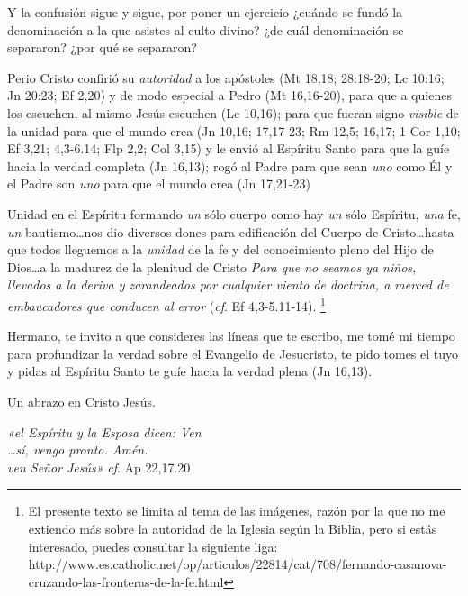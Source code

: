 \documentclass{article}
\begin{document}
\noindent
Y la confusión sigue y sigue, por poner un ejercicio ¿cuándo se fundó la denominación a la que asistes al culto divino? ¿de cuál denominación se separaron? ¿por qué se separaron?

Perio Cristo confirió su \emph{autoridad} a los apóstoles (Mt 18,18; 28:18-20; Lc 10:16; Jn 20:23; Ef 2,20) y de modo especial a Pedro (Mt 16,16-20), para que a quienes los escuchen, al mismo Jesús escuchen (Lc 10,16); para que fueran signo \emph{visible} de la unidad para que el mundo crea (Jn 10,16; 17,17-23; Rm 12,5; 16,17; 1 Cor 1,10; Ef 3,21; 4,3-6.14; Flp 2,2; Col 3,15) y le envió al Espíritu Santo para que la guíe hacia la verdad completa (Jn 16,13); rogó al Padre para que sean \emph{uno} como Él y el Padre son \emph{uno} para que el mundo crea (Jn 17,21-23)

Unidad en el Espíritu formando \emph{un} sólo cuerpo como hay \emph{un} sólo Espíritu, \emph{una} fe, \emph{un} bautismo\ldots nos dio diversos dones para edificación del Cuerpo de Cristo\ldots hasta que todos lleguemos a la \emph{unidad} de la fe y del conocimiento pleno del Hijo de Dios\ldots a la madurez de la plenitud de Cristo \emph{Para que no seamos ya niños, llevados a la deriva y zarandeados por cualquier viento de doctrina, a merced de embaucadores que conducen al error} (\emph{cf}. Ef 4,3-5.11-14).%
    \footnote{El presente texto se limita al tema de las imágenes, razón por la que no me extiendo más sobre la autoridad de la Iglesia según la Biblia, pero si estás interesado, puedes consultar la siguiente liga:\\ http://www.es.catholic.net/op/articulos/22814/cat/708/fernando-casanova-cruzando-las-fronteras-de-la-fe.html}
    
Hermano, te invito a que consideres las líneas que te escribo, me tomé mi tiempo para profundizar la verdad sobre el Evangelio de Jesucristo, te pido tomes el tuyo y pidas al Espíritu Santo te guíe hacia la verdad plena (Jn 16,13).

Un abrazo en Cristo Jesús.

\begin{center}
\emph{«el Espíritu y la Esposa dicen: Ven\\
{\ldots}sí, vengo pronto. Amén.\\
ven Señor Jesús»}
\emph{cf}. Ap 22,17.20
\end{center}

% 
% 
\end{document}
